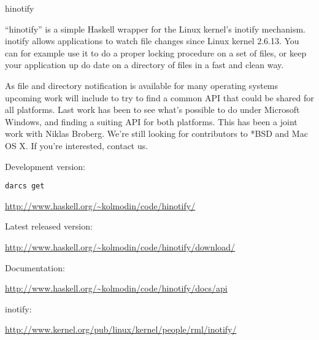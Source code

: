 \begin{hcarentry}{hinotify}
\makeheader

``hinotify'' is a simple Haskell wrapper for the Linux kernel's inotify
mechanism. inotify allows applications to watch file changes since
Linux kernel 2.6.13.  You can for example use it to do a proper
locking procedure on a set of files, or keep your application up do
date on a directory of files in a fast and clean way.

As file and directory notification is available for many operating systems
upcoming work will include to try to find a common API that could be shared
for all platforms. Last work has been to see what's possible to do under
Microsoft Windows, and finding a suiting API for both platforms. This has
been a joint work with Niklas Broberg. We're still looking for contributors
to *BSD and Mac OS X. If you're interested, contact us.

\FurtherReading
\begin{compactitem}
\item Development version:

  \texttt{darcs get}

  \url{http://www.haskell.org/~kolmodin/code/hinotify/}
\item Latest released version:

  \url{http://www.haskell.org/~kolmodin/code/hinotify/download/}
\item Documentation:

  \url{http://www.haskell.org/~kolmodin/code/hinotify/docs/api}
\item inotify:

  \url{http://www.kernel.org/pub/linux/kernel/people/rml/inotify/}
\end{compactitem}
\end{hcarentry}
